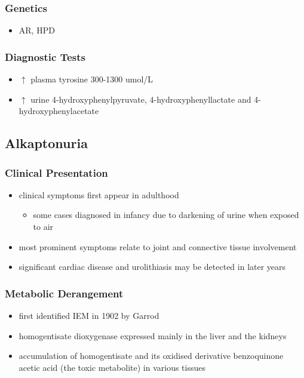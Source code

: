 \documentclass{scrartcl}
\begin{document}
\subsubsection{Genetics}
\label{sec:org883c8da}
\begin{itemize}
\item AR, HPD
\end{itemize}
\subsubsection{Diagnostic Tests}
\label{sec:orgeb373f7}
\begin{itemize}
\item \(\uparrow\) plasma tyrosine 300-1300 umol/L
\item \(\uparrow\) urine 4-hydroxyphenylpyruvate, 4-hydroxyphenyllactate and 4-hydroxyphenylacetate
\end{itemize}

\subsection{Alkaptonuria}
\label{sec:orgc42f993}
\subsubsection{Clinical Presentation}
\label{sec:org028fb5a}
\begin{itemize}
\item clinical symptoms first appear in adulthood
\begin{itemize}
\item some cases diagnosed in infancy due to darkening of urine when
exposed to air
\end{itemize}
\item most prominent symptoms relate to joint and connective tissue involvement
\item significant cardiac disease and urolithiasis may be detected in later years
\end{itemize}
\subsubsection{Metabolic Derangement}
\label{sec:org06084a6}
\begin{itemize}
\item first identified IEM in 1902 by Garrod
\item homogentisate dioxygenase expressed mainly in the liver and the
kidneys
\end{itemize}
\begin{itemize}
\item accumulation of homogentisate and its oxidised derivative
benzoquinone acetic acid (the toxic metabolite) in various tissues
\end{itemize}
\end{document}
